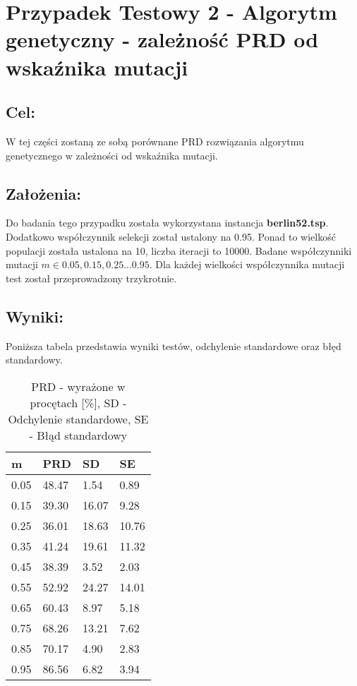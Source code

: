 \section{Przypadek Testowy 2 - Algorytm genetyczny - zależność PRD od wskaźnika mutacji}
  \subsection{Cel:}
    W tej części zostaną ze sobą porównane PRD rozwiązania algorytmu genetycznego w zależności od wskaźnika mutacji.
    \subsection{Założenia:}
    Do badania tego przypadku została wykorzystana instancja \textbf{berlin52.tsp}. Dodatkowo współczynnik selekcji został ustalony na 0.95. Ponad to wielkość populacji została ustalona na 10, liczba iteracji to 10000. Badane współczynniki mutacji \(m \in {0.05, 0.15, 0.25 ... 0.95}\). Dla każdej wielkości współczynnika mutacji test został przeprowadzony trzykrotnie.
  \subsection{Wyniki: }
  Poniższa tabela przedstawia wyniki testów, odchylenie standardowe oraz błęd standardowy.
  \begin{table}[!ht]
    \centering
    \begin{tabular}{|l|l|l|l|}
      \hline
          m & PRD & SD & SE \\ \hline
          0.05 & 48.47 & 1.54 & 0.89 \\ \hline
          0.15 & 39.30 & 16.07 & 9.28 \\ \hline
          0.25 & 36.01 & 18.63 & 10.76 \\ \hline
          0.35 & 41.24 & 19.61 & 11.32 \\ \hline
          0.45 & 38.39 & 3.52 & 2.03 \\ \hline
          0.55 & 52.92 & 24.27 & 14.01 \\ \hline
          0.65 & 60.43 & 8.97 & 5.18 \\ \hline
          0.75 & 68.26 & 13.21 & 7.62 \\ \hline
          0.85 & 70.17 & 4.90 & 2.83 \\ \hline
          0.95 & 86.56 & 6.82 & 3.94 \\ \hline
      \end{tabular}
    \caption{PRD - wyrażone w procętach [\%], SD - Odchylenie standardowe, SE - Błąd standardowy}
\end{table}
